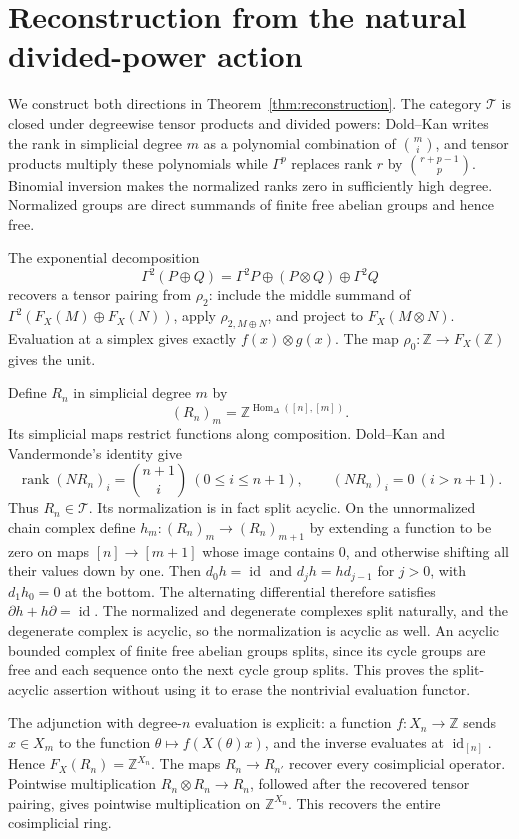 \documentclass[11pt,a4paper]{article}
\theoremstyle{definition}
\newcommand{\Hom}{\operatorname{Hom}}
\newcommand{\id}{\operatorname{id}}
\newcommand{\Z}{\mathbb Z}
\begin{document}
\section{Reconstruction from the natural divided-power action}\label{sec:reconstruction}
We construct both directions in Theorem~\ref{thm:reconstruction}. The category $\mathcal T$ is closed under degreewise tensor products and divided powers: Dold--Kan writes the rank in simplicial degree $m$ as a polynomial combination of $\binom mi$, and tensor products multiply these polynomials while $\Gamma^p$ replaces rank $r$ by $\binom{r+p-1}p$. Binomial inversion makes the normalized ranks zero in sufficiently high degree. Normalized groups are direct summands of finite free abelian groups and hence free.

The exponential decomposition
\[
 \Gamma^2(P\oplus Q)=\Gamma^2P\oplus(P\otimes Q)\oplus\Gamma^2Q
\]
recovers a tensor pairing from $\rho_2$: include the middle summand of $\Gamma^2(F_X(M)\oplus F_X(N))$, apply $\rho_{2,M\oplus N}$, and project to $F_X(M\otimes N)$. Evaluation at a simplex gives exactly $f(x)\otimes g(x)$. The map $\rho_0:\Z\to F_X(\Z)$ gives the unit.

Define $R_n$ in simplicial degree $m$ by
\[
 (R_n)_m=\Z^{\Hom_\Delta([n],[m])}.
\]
Its simplicial maps restrict functions along composition. Dold--Kan and Vandermonde's identity give
\[
 \operatorname{rank}(NR_n)_i=\binom{n+1}i\ (0\le i\le n+1),
 \qquad (NR_n)_i=0\ (i>n+1).
\]
Thus $R_n\in\mathcal T$. Its normalization is in fact split
acyclic. On the unnormalized chain complex define
$h_m:(R_n)_m\to(R_n)_{m+1}$ by extending a function to be zero on
maps $[n]\to[m+1]$ whose image contains $0$, and otherwise shifting
all their values down by one. Then $d_0h=\id$ and
$d_jh=hd_{j-1}$ for $j>0$, with $d_1h_0=0$ at the bottom.
The alternating differential therefore satisfies $\partial h+h\partial=\id$.
The normalized and degenerate complexes split naturally, and the
degenerate complex is acyclic, so the normalization is acyclic as
well. An acyclic bounded complex of finite free abelian groups splits,
since its cycle groups are free and each sequence onto the next
cycle group splits. This proves the split-acyclic assertion without
using it to erase the nontrivial evaluation functor.

The adjunction with degree-$n$ evaluation is explicit: a function $f:X_n\to\Z$ sends $x\in X_m$ to the function $\theta\mapsto f(X(\theta)x)$, and the inverse evaluates at $\id_{[n]}$. Hence $F_X(R_n)=\Z^{X_n}$. The maps $R_n\to R_{n'}$ recover every cosimplicial operator. Pointwise multiplication $R_n\otimes R_n\to R_n$, followed after the recovered tensor pairing, gives pointwise multiplication on $\Z^{X_n}$. This recovers the entire cosimplicial ring.
\end{document}
